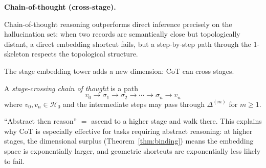 \medskip

\textbf{Chain-of-thought (cross-stage).}

Chain-of-thought reasoning outperforms direct inference precisely on the hallucination set: when two records are semantically close but topologically distant, a direct embedding shortcut fails, but a step-by-step path through the 1-skeleton respects the topological structure.

The stage embedding tower adds a new dimension: CoT can cross stages.

\begin{definition}
A \emph{stage-crossing chain of thought} is a path
\[
  v_0 \to \sigma_1 \to \sigma_2 \to \cdots \to \sigma_n \to v_n
\]
where $v_0, v_n \in \mathcal{H}_0$ and the intermediate steps may pass through $\Delta^{(m)}$ for $m \geq 1$.
\end{definition}

``Abstract then reason'' $=$ ascend to a higher stage and walk there. This explains why CoT is especially effective for tasks requiring abstract reasoning: at higher stages, the dimensional surplus (Theorem~\ref{thm:binding}) means the embedding space is exponentially larger, and geometric shortcuts are exponentially less likely to fail.
